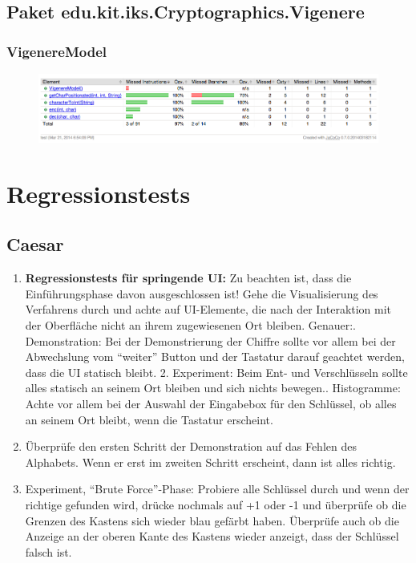 \documentclass{article}
\begin{document}
  \subsection{Paket edu.kit.iks.Cryptographics.Vigenere}
    \subsubsection{VigenereModel}
      \begin{figure}[H]
        \centering
          \includegraphics[width=\textwidth]{resources/coverage_vigenere_model}
      \end{figure}
\clearpage

\section{Regressionstests}
 \subsection{Caesar}
  \begin{enumerate}
   \item \textbf{Regressionstests für springende UI:}\newline
         Zu beachten ist, dass die Einführungsphase davon ausgeschlossen ist!\newline
         Gehe die Visualisierung des Verfahrens durch und achte auf UI-Elemente, die nach der Interaktion mit der Oberfläche 
         nicht an ihrem zugewiesenen Ort bleiben. Genauer:. Demonstration: Bei der Demonstrierung der Chiffre sollte vor allem bei der Abwechslung vom ``weiter'' Button und 
            der Tastatur darauf geachtet werden, dass die UI statisch bleibt.
         2. Experiment: Beim Ent- und Verschlüsseln sollte alles statisch an seinem Ort bleiben und sich nichts bewegen.. Histogramme: Achte vor allem bei der Auswahl der Eingabebox für den Schlüssel, ob alles an seinem Ort bleibt, wenn die
            Tastatur erscheint.
   \item Überprüfe den ersten Schritt der Demonstration auf das Fehlen des Alphabets. Wenn er erst im zweiten Schritt erscheint, dann ist
         alles richtig.
   \item Experiment, ``Brute Force''-Phase: Probiere alle Schlüssel durch und wenn der richtige gefunden wird, drücke nochmals auf +1 oder -1
         und überprüfe ob die Grenzen des Kastens sich wieder blau gefärbt haben. Überprüfe auch ob die Anzeige an der oberen Kante
         des Kastens wieder anzeigt, dass der Schlüssel falsch ist.     
  \end{enumerate}
  
\end{document}
